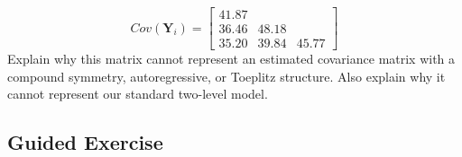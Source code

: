 \documentclass[
]{krantz}
\begin{document}
\begin{enumerate}
  \[ Cov(\mathbf{Y}_i) =  \left[
        \begin{array}{cccc}
          41.87 & &   \\
          36.46 & 48.18 &  \\
          35.20 & 39.84 & 45.77
        \end{array} \right] \]
  Explain why this matrix cannot represent an estimated covariance matrix with a compound symmetry, autoregressive, or Toeplitz structure. Also explain why it cannot represent our standard two-level model.
\end{enumerate}

\hypertarget{guided-exercise-1}{%
\subsection{Guided Exercise}\label{guided-exercise-1}}
\end{document}

